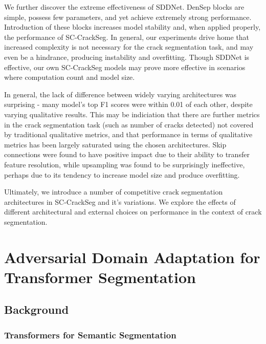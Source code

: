 \documentclass[a4paper,12pt]{report}
\begin{document}
We further discover the extreme effectiveness of SDDNet. DenSep blocks are simple, possess few parameters, and yet achieve extremely strong performance. Introduction of these blocks increases model stability and, when applied properly, the performance of SC-CrackSeg. In general, our experiments drive home that increased complexity is not necessary for the crack segmentation task, and may even be a hindrance, producing instability and overfitting. Though SDDNet is effective, our own SC-CrackSeg models may prove more effective in scenarios where computation count and model size.

In general, the lack of difference between widely varying architectures was surprising - many model's top F1 scores were within 0.01 of each other, despite varying qualitative results. This may be indiciation that there are further metrics in the crack segmentation task (such as number of cracks detected) not covered by traditional qualitative metrics, and that performance in terms of qualitative metrics has been largely saturated using the chosen architectures. Skip connections were found to have positive impact due to their ability to transfer feature resolution, while upsampling was found to be surprisingly ineffective, perhaps due to its tendency to increase model size and produce overfitting.

Ultimately, we introduce a number of competitive crack segmentation architectures in SC-CrackSeg and it's variations. We explore the effects of different architectural and external choices on performance in the context of crack segmentation.

\chapter{Adversarial Domain Adaptation for Transformer Segmentation}

\section{Background}

\subsection*{Transformers for Semantic Segmentation}
\end{document}
